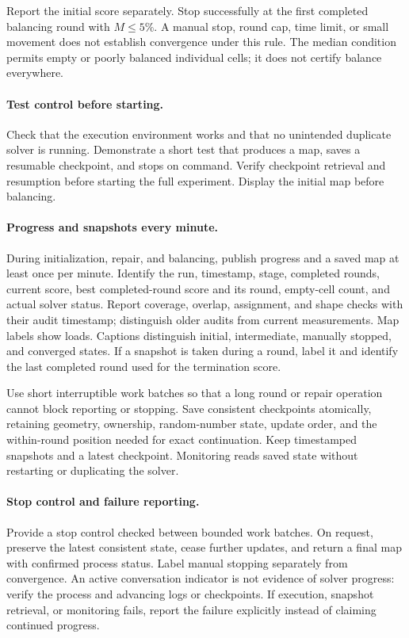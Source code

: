 Report the initial score separately. Stop successfully at the first
completed balancing round with $M\leq5\%$. A manual stop, round cap,
time limit, or small movement does not establish convergence under
this rule. The median condition permits empty or poorly balanced
individual cells; it does not certify balance everywhere.

\paragraph{Test control before starting.}
Check that the execution environment works and that no unintended
duplicate solver is running. Demonstrate a short test that produces
a map, saves a resumable checkpoint, and stops on command.
Verify checkpoint retrieval and resumption before starting the full
experiment. Display the initial map before balancing.

\paragraph{Progress and snapshots every minute.}
During initialization, repair, and balancing, publish progress and a
saved map at least once per minute. Identify the run, timestamp,
stage, completed rounds, current score, best completed-round score
and its round, empty-cell count, and actual solver status.
Report coverage, overlap, assignment, and shape checks with their
audit timestamp; distinguish older audits from current measurements.
Map labels show loads. Captions distinguish initial, intermediate,
manually stopped, and converged states. If a snapshot is taken during
a round, label it and identify the last completed round used for the
termination score.

Use short interruptible work batches so that a long round or repair
operation cannot block reporting or stopping. Save consistent
checkpoints atomically, retaining geometry, ownership, random-number
state, update order, and the within-round position needed for exact
continuation. Keep timestamped snapshots and a latest checkpoint.
Monitoring reads saved state without restarting or duplicating the
solver.

\paragraph{Stop control and failure reporting.}
Provide a stop control checked between bounded work batches.
On request, preserve the latest consistent state, cease further
updates, and return a final map with confirmed process status.
Label manual stopping separately from convergence.
An active conversation indicator is not evidence of solver progress:
verify the process and advancing logs or checkpoints.
If execution, snapshot retrieval, or monitoring fails, report the
failure explicitly instead of claiming continued progress.
